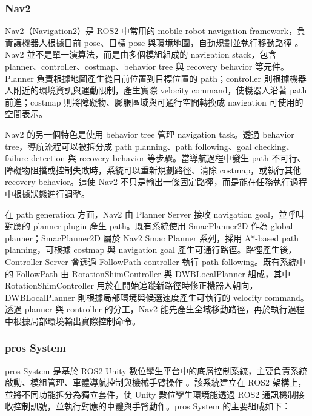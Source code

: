 \documentclass[12pt,a4paper]{article}
\begin{document}
\subsubsection{Nav2}

Nav2（Navigation2）是 ROS2 中常用的 mobile robot navigation framework，負責讓機器人根據目前 pose、目標 pose 與環境地圖，自動規劃並執行移動路徑 \cite{nav2_concepts}。Nav2 並不是單一演算法，而是由多個模組組成的 navigation stack，包含 planner、controller、costmap、behavior tree 與 recovery behavior 等元件。Planner 負責根據地圖產生從目前位置到目標位置的 path；controller 則根據機器人附近的環境資訊與運動限制，產生實際 velocity command，使機器人沿著 path 前進；costmap 則將障礙物、膨脹區域與可通行空間轉換成 navigation 可使用的空間表示。

Nav2 的另一個特色是使用 behavior tree 管理 navigation task。透過 behavior tree，導航流程可以被拆分成 path planning、path following、goal checking、failure detection 與 recovery behavior 等步驟。當導航過程中發生 path 不可行、障礙物阻擋或控制失敗時，系統可以重新規劃路徑、清除 costmap，或執行其他 recovery behavior。這使 Nav2 不只是輸出一條固定路徑，而是能在任務執行過程中根據狀態進行調整。

在 path generation 方面，Nav2 由 Planner Server 接收 navigation goal，並呼叫對應的 planner plugin 產生 path。既有系統使用 SmacPlanner2D 作為 global planner；SmacPlanner2D 屬於 Nav2 Smac Planner 系列，採用 A*-based path planning，可根據 costmap 與 navigation goal 產生可通行路徑。路徑產生後，Controller Server 會透過 FollowPath controller 執行 path following。既有系統中的 FollowPath 由 RotationShimController 與 DWBLocalPlanner 組成，其中 RotationShimController 用於在開始追蹤新路徑時修正機器人朝向，DWBLocalPlanner 則根據局部環境與候選速度產生可執行的 velocity command。透過 planner 與 controller 的分工，Nav2 能先產生全域移動路徑，再於執行過程中根據局部環境輸出實際控制命令。

\subsubsection{pros System}

pros System 是基於 ROS2-Unity 數位孿生平台中的底層控制系統，主要負責系統啟動、模組管理、車體導航控制與機械手臂操作 \cite{yushiang2025}。該系統建立在 ROS2 架構上，並將不同功能拆分為獨立套件，使 Unity 數位孿生環境能透過 ROS2 通訊機制接收控制訊號，並執行對應的車體與手臂動作。pros System 的主要組成如下：
\end{document}
